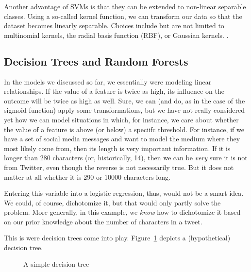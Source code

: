 Another advantage of SVMs is that they can be extended to non-linear separable classes. Using a so-called kernel function, we can transform our data so that the dataset becomes linearly separable. Choices include but are not limited to multinomial kernels, the radial basis function (RBF),  or Gaussian kernels. 
.




\subsection{Decision Trees and Random Forests}
In the models we discussed so far, we essentially were modeling linear relationships. If the value of a feature is twice as high, its influence on the outcome will be twice as high as well.
Sure, we can (and do, as in the case of the sigmoid function) apply some transformations, but we have not really considered yet how we can model situations in which, for instance, we care about whether the value of a feature is above (or below) a speciifc threshold.
For instance, if we have a set of social media messages and want to model the medium where they most likely come from, then its length is  very important information. If it is longer than 280 characters (or, historically, 14), then we can be \emph{very} sure it is not from Twitter, even though the reverse is not necessarily true. But it does not matter at all whether it is 290 or $10000$ characters long.

Entering this variable into a logistic regression, thus, would not be a smart idea.
We could, of course, dichotomize it, but that would only partly solve the problem.
More generally, in this example, we \emph{know} how to dichotomize it based on our prior knowledge about the number of characters in a tweet.

This is were decision trees come into play. Figure~\ref{fig:decisiontree} depicts a (hypothetical) decision tree.

\begin{figure}
  \centering
{}
  \caption{\label{fig:decisiontree}A simple decision tree}
\end{figure}

